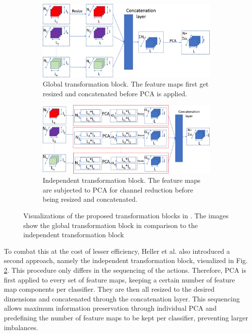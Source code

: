 \begin{figure}[H]
 \captionsetup[subfigure]{justification=centering}
 \centering
\begin{subfigure}[b]{0.4\textwidth} %
 \centering
 \includegraphics[width=\textwidth]{figures/global_transformation_block.jpg}
 \caption{Global transformation block. The feature maps first get resized and concatenated before PCA is applied.}
 \label{fig:GTBheller}
 \end{subfigure}
 \hspace{0.05\textwidth} %
 \begin{subfigure}[b]{0.4\textwidth} %
 \centering
 \includegraphics[width=\textwidth]{figures/independent_transformation_block.jpg}
 \caption{Independent transformation block. The feature maps are subjected to PCA for channel reduction before being resized and concatenated.}
 \label{fig:ITBheller}
\end{subfigure}
 
 \caption{Visualizations of the proposed transformation blocks in \cite{EnsembleHeller2023}. The images show the global transformation 
block in comparison to the independent transformation block \cite{EnsembleHeller2023}}
 \label{fig:hellerensembleblocks}
\end{figure}




To combat this at the cost of lesser efficiency, Heller et al. also introduced a second approach, namely the independent transformation block, 
visualized in Fig. \ref{fig:ITBheller}. 
This procedure only differs in the sequencing of the actions. Therefore, PCA is first applied to every set of feature maps, keeping 
a certain number of feature map components per classifier. They are then all resized to the desired dimensions and concatenated through 
the concatenation layer. This sequencing allows maximum information preservation through individual PCA and predefining the number 
of feature maps to be kept per classifier, preventing larger imbalances.



